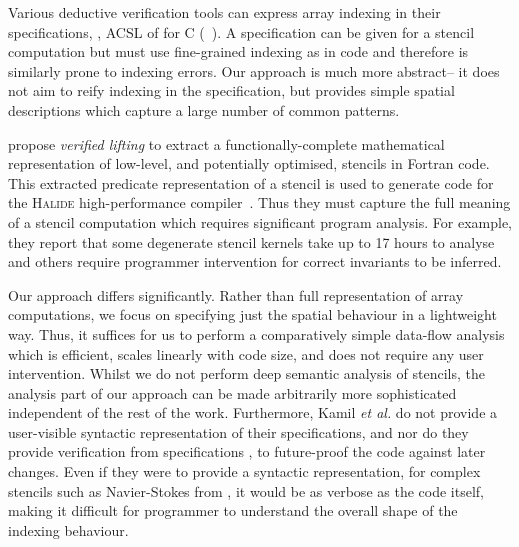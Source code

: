 \noindent
Various deductive verification tools can express array indexing in their
specifications, \eg{}, ACSL of \citet{baudin2008acsl} for C
(\eg{}~\citet[Example 3.4.1]{burghardt2010acsl}). A specification can be given
for a stencil computation but must use fine-grained indexing as in code and
therefore is similarly prone to indexing errors. Our approach is much more
abstract-- it does not aim to reify indexing in the specification, but
provides simple spatial descriptions which capture a large number of common
patterns.

\citet{kamil2016verified} propose \emph{verified lifting} to extract a
functionally-complete mathematical representation of low-level, and potentially
optimised, stencils in Fortran code. This extracted predicate representation of
a stencil is used to generate code for the \textsc{Halide} high-performance
compiler~\citep{ragan2013halide}. Thus they must capture the full meaning of a
stencil computation which requires significant program analysis. For example,
they report that some degenerate stencil kernels take up to 17 hours to analyse
and others require programmer intervention for correct invariants to be
inferred.


Our approach differs significantly. Rather than full representation of
array computations, we focus on specifying just the spatial behaviour
in a lightweight way.  Thus, it suffices for us to perform a
comparatively simple data-flow analysis which is efficient, scales
linearly with code size, and does not require any user intervention.
Whilst we do not perform deep semantic analysis of stencils, the
analysis part of our approach can be made arbitrarily more
sophisticated independent of the rest of the work.
%
Furthermore, Kamil \emph{et al.} do not provide a user-visible syntactic
representation of their specifications, and nor do they provide verification
from specifications \eg{}, to future-proof the code against later changes. Even
if they were to provide a syntactic representation, for complex stencils such as
Navier-Stokes from , it would be as verbose as the code
itself, making it difficult for programmer to understand the overall shape of
the indexing behaviour.

